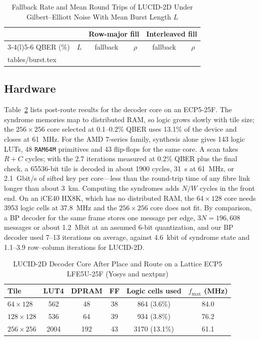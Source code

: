 \documentclass[conference]{IEEEtran}
\makeatletter
\newcommand{\tablerows}[1]{\@@input #1 }
\makeatother
\begin{document}
\begin{table}[t]
\caption{Fallback Rate and Mean Round Trips of LUCID-2D Under Gilbert--Elliott Noise With Mean Burst Length $L$}
\label{tab:burst}
\centering
\setlength{\tabcolsep}{4pt}
\begin{tabular}{@{}lccccc@{}}
\toprule
& & \multicolumn{2}{c}{Row-major fill} & \multicolumn{2}{c}{Interleaved fill}\\
\cmidrule(lr){3-4}\cmidrule(l){5-6}
QBER (\%) & $L$ & fallback & $\rho$ & fallback & $\rho$\\
\midrule
\tablerows{tables/burst.tex}
\bottomrule
\end{tabular}
\end{table}

\subsection{Hardware}
Table~\ref{tab:hw} lists post-route results for the decoder core on an ECP5-25F. The syndrome memories map to distributed RAM, so logic grows slowly with tile size; the $256\times256$ core selected at 0.1--0.2\% QBER uses 13.1\% of the device and closes at 61~MHz. For the AMD 7-series family, synthesis alone gives 143 logic LUTs, 48 \texttt{RAM64M} primitives and 43 flip-flops for the same core. A scan takes $R+C$ cycles; with the 2.7 iterations measured at 0.2\% QBER plus the final check, a 65536-bit tile is decoded in about 1900 cycles, 31~\textmu s at 61~MHz, or 2.1~Gbit/s of sifted key per core---less than the round-trip time of any fibre link longer than about 3~km. Computing the syndromes adds $N/W$ cycles in the front end. On an iCE40 HX8K, which has no distributed RAM, the $64\times128$ core needs 3953 logic cells at 37.8~MHz and the $256\times256$ core does not fit. By comparison, a BP decoder for the same frame stores one message per edge, $3N=196{,}608$ messages or about 1.2~Mbit at an assumed 6-bit quantization, and our BP decoder used 7--13 iterations on average, against 4.6~kbit of syndrome state and 1.1--3.9 row--column iterations for LUCID-2D.

\begin{table}[t]
\caption{LUCID-2D Decoder Core After Place and Route on a Lattice ECP5 LFE5U-25F (Yosys and nextpnr)}
\label{tab:hw}
\centering
\setlength{\tabcolsep}{4pt}
\begin{tabular}{@{}lccccc@{}}
\toprule
Tile & LUT4 & DPRAM & FF & Logic cells used & $f_{\max}$ (MHz)\\
\midrule
$64\times128$ & 562 & 48 & 38 & 864 (3.6\%) & 84.0\\
$128\times128$ & 536 & 64 & 39 & 934 (3.8\%) & 76.2\\
$256\times256$ & 2004 & 192 & 43 & 3170 (13.1\%) & 61.1\\
\bottomrule
\end{tabular}
\end{table}
\end{document}
